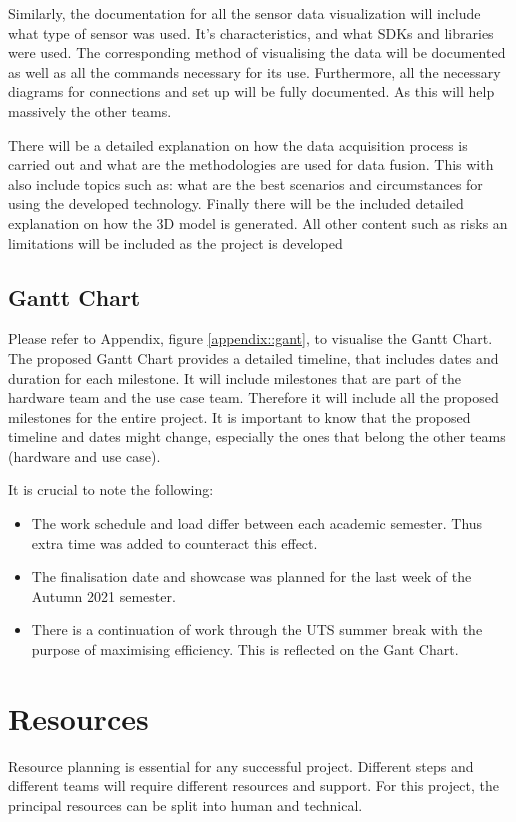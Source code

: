 \documentclass[12pt]{report}
\begin{document}
Similarly, the documentation for all the sensor data visualization will  include what type of sensor was used. It’s characteristics, and what SDKs and libraries were used. 
The corresponding method of visualising the data will be documented as well as all the commands necessary for its use. 
Furthermore, all the necessary diagrams for connections and set up will be fully documented. As this will help massively the other teams. 

There will be a detailed explanation on how the data acquisition process is carried out and what are the methodologies are used for data fusion. 
This  with  also include topics such as: what are the best scenarios and circumstances for using the developed technology. 
Finally there will be the included detailed explanation on how the 3D model is generated. 
All other content such as risks an limitations will be included as the project is developed

\subsection{Gantt Chart}
Please refer to Appendix, figure \ref{appendix::gant}, to visualise the Gantt Chart. The proposed Gantt Chart  provides a detailed timeline, that includes dates and duration for each milestone. 
It will include milestones that are part of the hardware team and the use case team. Therefore it will include all the proposed milestones for the entire project. 
It is important to know that the proposed timeline and dates might change, especially the ones that belong the other teams (hardware and use case). 

It is crucial to note the following:
\begin{itemize}
  \item The work schedule and load differ between each academic semester. Thus extra time was added to counteract this effect.
  \item The finalisation date and showcase was planned for the last week of the Autumn 2021 semester. 
  \item There is a continuation of work through the UTS summer break with the purpose of maximising efficiency. This is reflected on the Gant Chart.
\end{itemize}

\section{Resources}
Resource planning is essential for any successful project. 
Different steps and different teams will require different resources and support. For this project, the principal resources can be split into human and technical. 
\end{document}
